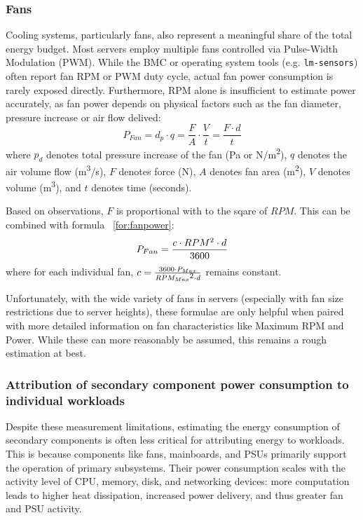 \subsubsection{Fans}
Cooling systems, particularly fans, also represent a meaningful share of the total energy budget. Most servers employ multiple fans controlled via Pulse-Width Modulation (PWM). While the BMC or operating system tools (e.g. \texttt{lm-sensors}) often report fan RPM or PWM duty cycle, actual fan power consumption is rarely exposed directly. Furthermore, RPM alone is insufficient to estimate power accurately, as fan power depends on physical factors such as the fan diameter, pressure increase or air flow delived\parencite{basmadjianCloudComputingIts2012}:
\begin{equation}
\label{for:fanpower}
    P_{Fan} = d_p \cdot q = \frac{F}{A} \cdot \frac{V}{t} = \frac{F \cdot d}{t}
\end{equation}
where $p_d$ denotes total pressure increase of the fan (Pa or N/m\textsuperscript{2}), $q$ denotes the air volume flow (m\textsuperscript{3}/s), $F$ denotes force (N), $A$ denotes fan area (m\textsuperscript{2}), $V$ denotes volume (m\textsuperscript{3}), and $t$ denotes time (seconds).

Based on observations, $F$ is proportional with to the sqare of $RPM$. This can be combined with formula ~\ref{for:fanpower}:
\begin{equation}
    P_{Fan} = \frac{c \cdot RPM\textsuperscript{2} \cdot d}{3600}
\end{equation}
where for each individual fan, $c = \frac{3600 \cdot P_{Max}}{RPM_{Max}\textsuperscript{2} \cdot d}$ remains constant.

Unfortunately, with the wide variety of fans in servers (especially with fan size restrictions due to server heights), these formulae are only helpful when paired with more detailed information on fan characteristics like Maximum RPM and Power. While these can more reasonably be assumed, this remains a rough estimation at best.

\subsubsection{Attribution of secondary component power consumption to individual workloads}
Despite these measurement limitations, estimating the energy consumption of secondary components is often less critical for attributing energy to workloads. This is because components like fans, mainboards, and PSUs primarily support the operation of primary subsystems. Their power consumption scales with the activity level of CPU, memory, disk, and networking devices: more computation leads to higher heat dissipation, increased power delivery, and thus greater fan and PSU activity.

